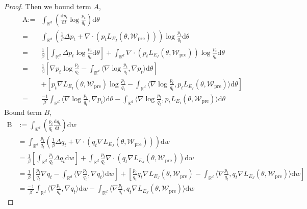 \begin{proof}
	Then we bound term $A$,
    \small{
	$$
	\begin{aligned}
		\text{A} :=&\int_{\mathbb{R}^d}\left(\frac{\mathrm{d}p_t}{\mathrm{d}t}\log\frac{p_t}{q_t}\right)\mathrm{d}\theta  \\
		=&\int_{\mathbb{R}^d}\left(\frac1\beta\Delta p_t+\nabla \cdot(p_t L_{E_I}(\theta, \mathcal{W}_{\text{pre}}))\right)\log\frac{p_t}{q_t}\mathrm{d}\theta \\
		=&\frac1\beta\left[\int_{\mathbb{R}^d}\Delta p_t\log\frac{p_t}{q_t}\mathrm{d}\theta\right]+\int_{\mathbb{R}^d}\nabla\cdot(p_tL_{E_I}(\theta, \mathcal{W}_{\text{pre}}))\log\frac{p_t}{q_t}\mathrm{d}\theta \\
		=&\frac1\beta\left[\nabla p_t\operatorname{log}\frac{p_t}{q_t}-\int_{\mathbb{R}^d}\langle\nabla\log\frac{p_t}{q_t},\nabla p_t\rangle\mathrm{d}\theta\right]\\
        &+\left[p_t\nabla L_{E_I}(\theta, \mathcal{W}_{\text{pre}})\log\frac{p_t}{q_t}-\int_{\mathbb{R}^d}\langle\nabla\log\frac{p_t}{q_t},p_tL_{E_I}(\theta, \mathcal{W}_{\text{pre}})\rangle\mathrm{d}\theta\right]\\
		=&\frac{-1}\beta\int_{\mathbb{R}^d}\langle\nabla\log\frac{p_t}{q_t},\nabla p_t\rangle\mathrm{d}\theta-\int_{\mathbb{R}^d}\langle\nabla\log\frac{p_t}{q_t},p_tL_{E_I}(\theta, \mathcal{W}_{\text{pre}})\rangle\mathrm{d}\theta
	\end{aligned}
	$$
    }
	Bound term $B$, 
	$$
	\begin{aligned}
		\text{B}& :=\int_{\mathbb{R}^d}\left(\frac{p_t}{q_t}\frac{\mathrm{d}q_t}{\mathrm{d}t}\right)\mathrm{d}w  \\
		&=\int_{\mathbb{R}^d}\frac{p_t}{q_t}\left(\frac1\beta\Delta q_t+\nabla\cdot(q_t\nabla L_{E_J}(\theta, \mathcal{W}_{\text{pre}}))\right)\mathrm{d}w \\
		&=\frac1\beta\left[\int_{\mathbb{R}^d}\frac{p_t}{q_t}\Delta q_t\mathrm{d}w\right]+\int_{\mathbb{R}^d}\frac{p_t}{q_t}\nabla\cdot(q_t\nabla L_{E_J}(\theta, \mathcal{W}_{\text{pre}}))\mathrm{d}w \\ 
		&=\frac1\beta\left[\frac{p_t}{q_t}\nabla q_t-\int_{\mathbb{R}^d}\langle\nabla\frac{p_t}{q_t},\nabla q_t\rangle\mathrm{d}w\right]+\left[\frac{p_t}{q_t}q_t\nabla L_{E_J}(\theta, \mathcal{W}_{\text{pre}})-\int_{\mathbb{R}^d}\langle\nabla\frac{p_t}{q_t},q_t\nabla L_{E_J}(\theta, \mathcal{W}_{\text{pre}})\rangle\mathrm{d}w\right]\\
		&=\frac{-1}\beta\int_{\mathbb{R}^d}\langle\nabla\frac{p_t}{q_t},\nabla q_t\rangle\mathrm{d}w-\int_{\mathbb{R}^d}\langle\nabla\frac{p_t}{q_t},q_t\nabla L_{E_J}(\theta, \mathcal{W}_{\text{pre}})\rangle\mathrm{d}w

\end{aligned}$$
\end{proof}
